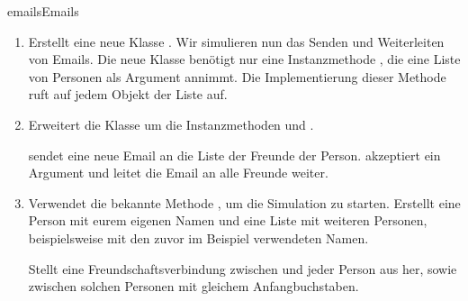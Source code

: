 \documentclass[parskip=half, final]{scrreprt}
\begin{document}
\begin{lecture}
\begin{exc}
\begin{excitem}{emails}{Emails}
\begin{enumerate}
\begin{objclst}
if (self.friends==nil) { // Testet, ob self.friends bereits ein Objekt hält
    self.friends = [[NSMutableArray alloc] init]; // Weist dem Attribut self.friends eine neu erstellte Liste zu
}
\end{objclst}

\item Erstellt eine neue Klasse . Wir simulieren nun das Senden und Weiterleiten von Emails. Die neue Klasse  benötigt nur eine Instanzmethode , die eine Liste von Personen  als Argument annimmt. Die Implementierung dieser Methode ruft  auf jedem Objekt der Liste auf.
\item Erweitert die Klasse  um die Instanzmethoden  und .

 sendet eine neue Email an die Liste der Freunde der Person.
 akzeptiert ein Argument  und leitet die Email an alle Freunde weiter.


\item Verwendet die bekannte Methode , um die Simulation zu starten. Erstellt eine Person  mit eurem eigenen Namen und eine Liste  mit weiteren Personen, beispielsweise mit den zuvor im Beispiel verwendeten Namen.

Stellt eine Freundschaftsverbindung zwischen  und jeder Person aus  her, sowie zwischen solchen Personen mit gleichem Anfangbuchstaben.



\end{enumerate}
\end{excitem}
\end{exc}
\end{lecture}
\end{document}
